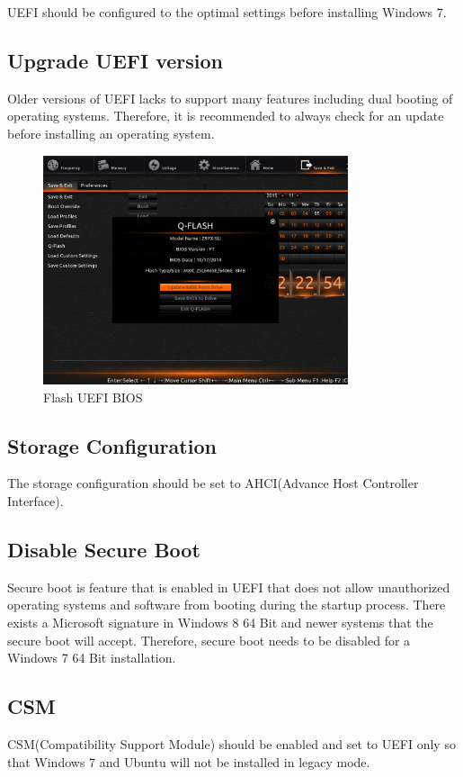 \documentclass[11pt,letterpaper]{article}
\begin{document}
UEFI should be configured to the optimal settings before installing Windows 7.
	\subsection{Upgrade UEFI version}
	Older versions of UEFI lacks to support many features including dual booting of operating systems. Therefore, it is recommended to always check for an update before installing an operating system.
	
	\begin{figure}[]
      \centering
      \includegraphics[width=0.8\textwidth]{q-flash}
      \caption{Flash UEFI BIOS}
      \label{fig:Flash_UEFI_BIOS}
    \end{figure}
	
	\subsection{Storage Configuration}
	The storage configuration should be set to AHCI(Advance Host Controller Interface).
	\subsection{Disable Secure Boot}
	Secure boot is feature that is enabled in UEFI that does not allow unauthorized operating systems and software from booting during the startup process. There exists a Microsoft signature in Windows 8 64 Bit and newer systems that the secure boot will accept. Therefore, secure boot needs to be disabled for a Windows 7 64 Bit installation. 
	\subsection{CSM}
	CSM(Compatibility Support Module) should be enabled and set to UEFI only so that Windows 7 and Ubuntu will not be installed in legacy mode.
	
\end{document}
